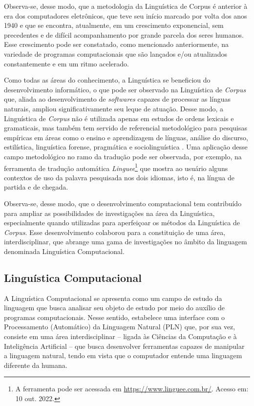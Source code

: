 \documentclass[portuguese]{textolivre}
\begin{document}
Observa-se, desse modo, que a metodologia da Linguística de Corpus é anterior à era dos computadores eletrônicos, que teve seu início marcado por volta dos anos 1940 e que se encontra, atualmente, em um crescimento exponencial, sem precedentes e de difícil acompanhamento por grande parcela dos seres humanos. Esse crescimento pode ser constatado, como mencionado anteriormente, na variedade de programas computacionais que são lançados e/ou atualizados constantemente e em um ritmo acelerado.

Como todas as áreas do conhecimento, a Linguística se beneficiou do desenvolvimento informático, o que pode ser observado na Linguística de \emph{Corpus} que, aliada ao desenvolvimento de \emph{softwares} capazes de processar as línguas naturais, ampliou significativamente seu leque de atuação. Desse modo, a Linguística de \emph{Corpus} não é utilizada apenas em estudos de ordens lexicais e gramaticais, mas também tem servido de referencial metodológico para pesquisas empíricas em áreas como o ensino e aprendizagem de línguas, análise do discurso, estilística, linguística forense, pragmática e sociolinguística \cite[p. 7]{okeefe2010routledge}. Uma aplicação desse campo metodológico no ramo da tradução pode ser observada, por exemplo, na ferramenta de tradução automática \emph{Linguee}\footnote{A ferramenta pode ser acessada em \url{https://www.linguee.com.br/}. Acesso em: 10 out. 2022.} que mostra ao usuário alguns contextos de uso da palavra pesquisada nos dois idiomas, isto é, na língua de partida e de chegada. 

Observa-se, desse modo, que o desenvolvimento computacional tem contribuído para ampliar as possibilidades de investigações na área da Linguística, especialmente quando utilizadas para aperfeiçoar os métodos da Linguística de \emph{Corpus}. Esse desenvolvimento colaborou para a constituição de uma área, interdisciplinar, que abrange uma gama de investigações no âmbito da linguagem denominada Linguística Computacional. 


\subsection{Linguística Computacional}
A Linguística Computacional se apresenta como um campo de estudo da linguagem que busca analisar seu objeto de estudo por meio do auxílio de programas computacionais. Nesse sentido, estabelece uma interface com o Processamento (Automático) da Linguagem Natural (PLN) que, por sua vez, consiste em uma área interdisciplinar – ligada às Ciências da Computação e à Inteligência Artificial – que busca desenvolver ferramentas capazes de manipular a linguagem natural, tendo em vista que o computador entende uma linguagem diferente da humana.
\end{document}
